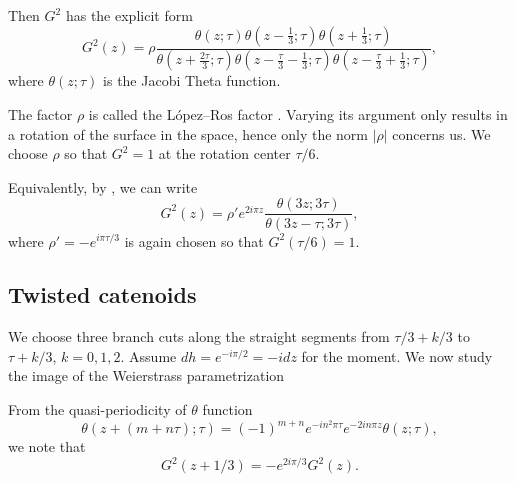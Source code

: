 \documentclass[a4paper]{amsart}
\newcommand{\C}{\mathbb{C}}
\theoremstyle{plain}
\theoremstyle{definition}
\begin{document}
Then $G^2$ has the explicit form
\[
	G^2(z) = \rho \frac{\theta(z;\tau) \theta(z-\frac{1}{3};\tau) \theta(z+\frac{1}{3};\tau)}{\theta(z+\frac{2\tau}{3};\tau) \theta(z - \frac{\tau}{3} - \frac{1}{3};\tau) \theta(z - \frac{\tau}{3} + \frac{1}{3};\tau)},
\]
where $\theta(z; \tau)$ is the Jacobi Theta function.

The factor $\rho$ is called the L\'opez--Ros factor \cite{lopez1991}.  Varying
its argument only results in a rotation of the surface in the space, hence only
the norm $|\rho|$ concerns us.  We choose $\rho$ so that $G^2 = 1$ at the
rotation center $\tau/6$. 

Equivalently, by \cite[(9.6.6)]{lawden1989}, we can write
\begin{equation}\label{eq:G}
	G^2(z) = \rho' e^{2 i \pi z} \frac{\theta(3z;3\tau)}{\theta(3z-\tau;3\tau)},
\end{equation}
where $\rho' = -e^{i\pi\tau/3}$ is again chosen so that $G^2(\tau/6) = 1$.

\subsection{Twisted catenoids}\label{sec:period}

We choose three branch cuts along the straight segments from $\tau/3 + k/3$ to
$\tau + k/3$, $k = 0, 1, 2$.  Assume $dh = e^{-i\pi/2} = -idz$ for the moment.
We now study the image of the Weierstrass parametrization

From the quasi-periodicity of $\theta$ function
\[
	\theta(z + (m+n\tau);\tau) = (-1)^{m+n} e^{-in^2\pi\tau} e^{-2in\pi z} \theta(z;\tau),
\]
we note that
\[
	G^2(z + 1/3) = -e^{2 i \pi / 3} G^2(z).
\]
\end{document}
